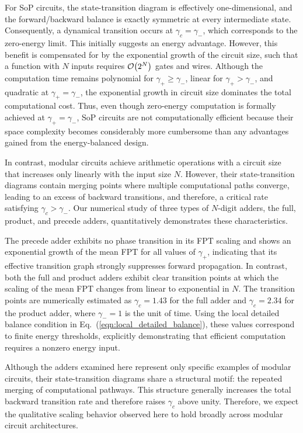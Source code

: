 \documentclass[%
 reprint,
superscriptaddress,
 amsmath,amssymb,
 aps,
 prx,
]{revtex4-2}
\begin{document}
For SoP circuits, the state-transition diagram is effectively one-dimensional, and the forward/backward balance is exactly symmetric at every intermediate state. Consequently, a dynamical transition occurs at $\gamma_c=\gamma_-$, which corresponds to the zero-energy limit. This initially suggests an energy advantage. However, this benefit is compensated for by the exponential growth of the circuit size, such that a function with $N$ inputs requires $\order{2^N}$ gates and wires. Although the computation time remains polynomial for $\gamma_+\ge \gamma_-$, linear for $\gamma_+> \gamma_-$, and quadratic at $\gamma_+=\gamma_-$, the exponential growth in circuit size dominates the total computational cost. 
Thus, even though zero-energy computation is formally achieved at $\gamma_+=\gamma_-$, SoP circuits are not computationally efficient because their space complexity becomes considerably more cumbersome than any advantages gained from the energy-balanced design. 

In contrast, modular circuits achieve arithmetic operations with a circuit size that increases only linearly with the input size $N$.  However, their state-transition diagrams contain merging points where multiple computational paths converge, leading to an excess of backward transitions, and therefore, a critical rate satisfying $\gamma_c>\gamma_{-} $. 
Our numerical study of three types of $N$-digit adders, the full, product, and precede adders, quantitatively demonstrates these characteristics. 

The precede adder exhibits no phase transition in its FPT scaling and shows an exponential growth of the mean FPT for all values of $\gamma_+$, indicating that its effective transition graph strongly suppresses forward propagation. 
In contrast, both the full and product adders exhibit clear transition points at which the scaling of the mean FPT changes from linear to exponential in $N$. 
The transition points are numerically estimated as $\gamma_c=1.43$ for the full adder and $\gamma_c=2.34$ for the product adder, where $\gamma_-=1$ is the unit of time. Using the local detailed balance condition in Eq.~(\ref{eqn:local_detailed_balance}), these values correspond to finite energy thresholds, explicitly demonstrating that efficient computation requires a nonzero energy input.  

Although the adders examined here represent only specific examples of modular circuits, their state-transition diagrams share a structural motif: the repeated merging of computational pathways. This structure generally increases the total backward transition rate and therefore raises $\gamma_c$ above unity. Therefore, we expect the qualitative scaling behavior observed here to hold broadly across modular circuit architectures.  
\end{document}
